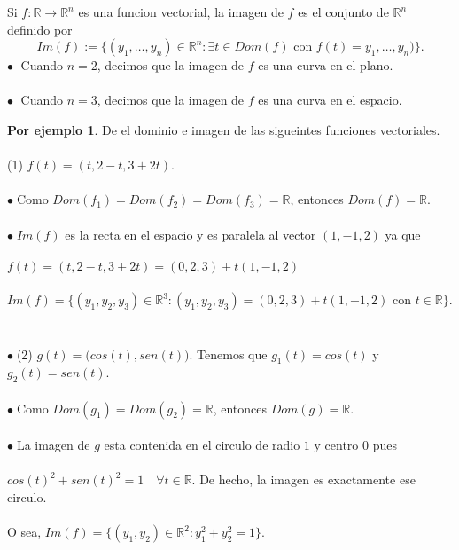 \documentclass{article}
\theoremstyle{definition}
\theoremstyle{definition}
\newtheorem*{ej}{Por ejemplo}
\theoremstyle{remark}
\newcommand\bl{$\bullet\;$}
\begin{document}
\begin{defi}
  Si $f: \mathbb{R} \to \mathbb{R}^n$ es una funcion vectorial, la imagen de $f$ es el conjunto de $\mathbb{R}^n$ definido por \[ 
    Im(f) := \big\{ (y_1, \dots , y_n) \in \mathbb{R}^n : \exists t \in Dom(f)  \text{ con } f(t)=y_1, \dots, y_n)  \big\}.
    \]
    \phantom{)}\textcolor{verdep2}{\bl} Cuando $n=2$, decimos que la imagen de $f$ es una curva en el plano.\\\\
    \phantom{)}\textcolor{verdep2}{\bl} Cuando $n=3$, decimos que la imagen de $f$ es una curva en el espacio.


\end{defi}
\begin{ej}
 De el dominio e imagen de las sigueintes funciones vectoriales. \\\\ \textcolor{verdep2}{(1)} $f(t)=(t,2-t,3+2t)$. \\\\
 \bl Como $Dom(f_1)=Dom(f_2)=Dom(f_3)=\mathbb{R}$, entonces $Dom(f)=\mathbb{R}$. \\\\ 
 \bl $Im(f)$ es la recta en el espacio y es paralela al vector $(1,-1,2)$ ya que \\\\ 
 \phantom{\bl} $f(t)=(t,2-t,3+2t)=(0,2,3)+t(1,-1,2)$ \\\\
 \phantom{\bl} $Im(f)=\big\{(y_1,y_2,y_3) \in \mathbb{R}^3 : (y_1,y_2,y_3)=(0,2,3)+t(1,-1,2) \text{ con } t \in \mathbb{R}\big\}$.
 \\\\\\
\bl \textcolor{verdep2}{(2)} $g(t)=\big(cos(t), sen(t)\big)$. Tenemos que $g_1(t)=cos(t)$ y $g_2(t)=sen(t)$.\\\\ 
\bl Como $Dom(g_1)=Dom(g_2)=\mathbb{R}$, entonces $Dom(g)=\mathbb{R}$. \\\\
\bl La imagen de $g$ esta contenida en el circulo de radio $1$ y centro $0$ pues \\\\ \phantom{\bl}$cos(t)^2+sen(t)^2=1 \quad \forall t \in \mathbb{R}$. De hecho, la imagen es exactamente ese circulo. \\\\\phantom{\bl}O sea, $Im(f)=\big\{(y_1,y_2) \in \mathbb{R}^2 : y_1^2 + y_2^2 = 1\big\}$.
\end{ej}
\end{document}
